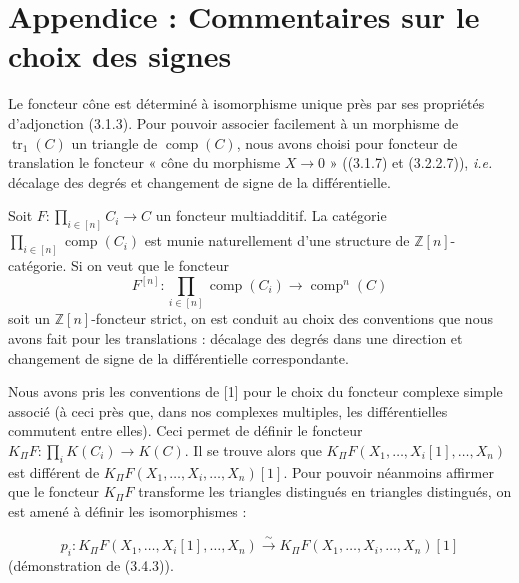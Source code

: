 \clearpage
{}%
\begingroup
\small
\setlength{\abovedisplayskip}{4pt plus 2pt minus 2pt}%
\setlength{\belowdisplayskip}{4pt plus 2pt minus 2pt}%

\section*{Appendice : Commentaires sur le choix des signes}

Le foncteur cône est déterminé à isomorphisme unique près par ses propriétés
d'adjonction (3.1.3). Pour pouvoir associer facilement à un morphisme de
$\operatorname{tr}_1(C)$ un triangle de $\operatorname{comp}(C)$, nous avons
choisi pour foncteur de translation le foncteur « cône du morphisme
$X\longrightarrow 0$ » ((3.1.7) et (3.2.2.7)), \emph{i.e.} décalage des
degrés et changement de signe de la différentielle.

Soit
$F\colon\prod_{i\in[n]}C_i\longrightarrow C$ un foncteur multiadditif. La
catégorie $\prod_{i\in[n]}\operatorname{comp}(C_i)$ est munie naturellement
d'une structure de $\mathbb Z[n]$-catégorie. Si on veut que le foncteur
\[
  F^{[n]}\colon\prod_{i\in[n]}\operatorname{comp}(C_i)
  \longrightarrow\operatorname{comp}^{n}(C)
\]
soit un $\mathbb Z[n]$-foncteur strict, on est conduit au choix des
conventions que nous avons fait pour les translations : décalage des degrés
dans une direction et changement de signe de la différentielle
correspondante.

Nous avons pris les conventions de [1] pour le choix du foncteur complexe
simple associé (à ceci près que, dans nos complexes multiples, les
différentielles commutent entre elles). Ceci permet de définir le foncteur
$K_{\Pi}F\colon\prod_i K(C_i)\longrightarrow K(C)$. Il se trouve alors que
$K_{\Pi}F(X_1,\ldots,X_i[1],\ldots,X_n)$ est différent de
$K_{\Pi}F(X_1,\ldots,X_i,\ldots,X_n)[1]$. Pour pouvoir néanmoins affirmer que
le foncteur $K_{\Pi}F$ transforme les triangles distingués en triangles
distingués, on est amené à définir les isomorphismes :

\[
  p_i\colon K_{\Pi}F(X_1,\ldots,X_i[1],\ldots,X_n)
  \xrightarrow{\ \sim\ }
  K_{\Pi}F(X_1,\ldots,X_i,\ldots,X_n)[1]
\]
(démonstration de (3.4.3)).

